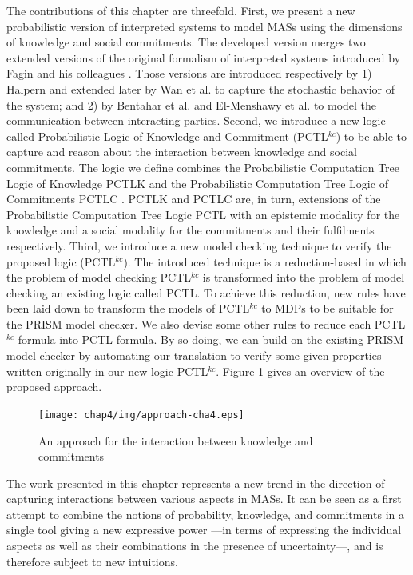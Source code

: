 The contributions of this chapter are threefold. First, we present a new probabilistic version of interpreted systems to model MASs using the dimensions of knowledge and social commitments. The developed version merges two extended versions of the original formalism of interpreted systems introduced by Fagin and his colleagues \cite{Fagin1995}. Those versions are introduced respectively by 1) Halpern \cite{Halpern2003} and extended later
by Wan et al. \cite{Wan2012,Wan2013} to capture the stochastic
behavior of the system; and 2) by Bentahar et al.
\cite{Bentahar2012} and El-Menshawy et al. \cite{El-Menshawy2013a}
to model the communication between interacting parties. Second, we
introduce a new logic called Probabilistic Logic of Knowledge and
Commitment (PCTL$^{kc}$) to be able to capture and reason about
the interaction between knowledge and social commitments. The
logic we define combines the Probabilistic Computation Tree Logic
of Knowledge PCTLK \cite{Wan2012,Wan2013} and the Probabilistic
Computation Tree Logic of Commitments PCTLC \cite{Sultan2013}.
PCTLK and PCTLC are, in turn, extensions of the Probabilistic
Computation Tree Logic PCTL \cite{Hansson1994} with an epistemic
modality for the knowledge and a social modality for the
commitments and their fulfilments respectively. Third, we
introduce a new model checking technique to verify the proposed
logic (PCTL$^{kc}$). The introduced technique is a reduction-based
in which the problem of model checking PCTL$^{kc}$ is transformed
into the problem of model checking an existing logic called PCTL.
To achieve this reduction, new rules have been laid down to
transform the models of PCTL$^{kc}$ to MDPs to be suitable for
the PRISM model checker. We also devise some other rules to reduce
each PCTL$^{kc}$ formula into PCTL formula. By so doing, we can
build on the existing PRISM model checker by automating our
translation to verify some given properties written originally in
our new logic PCTL$^{kc}$. Figure \ref{approach-cha4} gives an overview of the proposed approach.

\begin{figure}[h]
\begin{center}
\texttt{[image: chap4/img/approach-cha4.eps]}
  \caption{An approach for the interaction between knowledge and commitments}
\label{approach-cha4}
\end{center}
\end{figure}


The work presented in this chapter represents a new trend in the direction of capturing interactions between various aspects in MASs. It can be
seen as a first attempt to combine the notions of probability,
knowledge, and commitments in a single tool giving a new
expressive power ---in terms of expressing the individual aspects
as well as their combinations in the presence of uncertainty---,
and is therefore subject to new intuitions.



